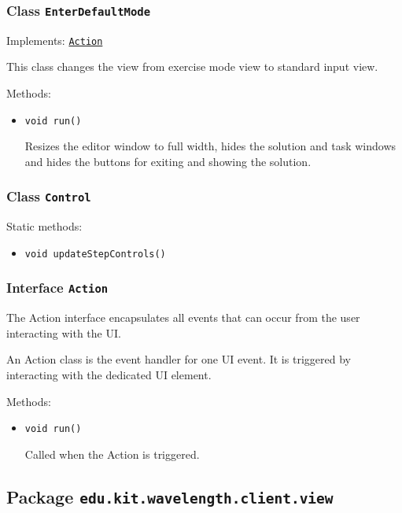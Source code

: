 \subsubsection{Class \texttt{EnterDefaultMode}}
\label{type:edu.kit.wavelength.client.view.action.EnterDefaultMode}
Implements: \texttt{\hyperref[type:edu.kit.wavelength.client.view.action.Action]{Action}}

This class changes the view from exercise mode view to standard input view.

Methods:
\begin{itemize}
\item \texttt{void run()}

Resizes the editor window to full width, hides the solution and task
 windows and hides the buttons for exiting and showing the solution.

\end{itemize}

\subsubsection{Class \texttt{Control}}
\label{type:edu.kit.wavelength.client.view.action.Control}


Static methods:
\begin{itemize}
\item \texttt{void updateStepControls()}



\end{itemize}

\subsubsection{Interface \texttt{Action}}
\label{type:edu.kit.wavelength.client.view.action.Action}
The Action interface encapsulates all events that can occur from the user
 interacting with the UI.
 
 An Action class is the event handler for one UI event. It is triggered by
 interacting with the dedicated UI element.

Methods:
\begin{itemize}
\item \texttt{void run()}

Called when the Action is triggered.

\end{itemize}

\subsection{Package \lstinline{edu.kit.wavelength.client.view}}
\label{pkg:edu.kit.wavelength.client.view}


